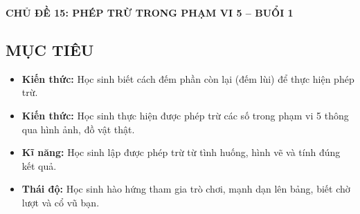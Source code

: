 \documentclass[../main.tex]{subfiles}
\begin{document}
\providecommand{\GPthe}{}\renewcommand{\GPthe}[2]{%
  \GPvat{#1}{1.4}{2.1}
  \node[draw,thick,rounded corners=4pt,fill=PKvangnhat,anchor=north,inner sep=2.5pt,minimum width=1.9cm,text height=1.7ex,text depth=0.5ex] at (0,-0.85) {#2};}
\providecommand{\GPgio}{}\renewcommand{\GPgio}[1]{%
  \draw[PKnau!70!black,line width=3pt] (-0.9,0.55) .. controls (-0.9,1.6) and (0.9,1.6) .. (0.9,0.55);
  \begin{scope}
    \clip (-1.2,0.6) -- (1.2,0.6) -- (0.9,-0.9) -- (-0.9,-0.9) -- cycle;
    \fill[yellow!45!brown!85] (-1.3,-1) rectangle (1.3,0.7);
    \foreach \y in {-0.9,-0.65,...,0.6}{\draw[PKnau!80!black,thick] (-1.3,\y) -- (1.3,\y);}
    \foreach \x in {-1.2,-0.95,...,1.3}{\draw[PKnau!60!black,thin] (\x,-1) -- (\x*0.8,0.7);}
  \end{scope}
  \draw[PKnau!50!black,thick,rounded corners=2pt] (-1.2,0.6) -- (1.2,0.6) -- (0.9,-0.9) -- (-0.9,-0.9) -- cycle;
  \fill[yellow!45!brown,draw=PKnau!50!black,thick,rounded corners=3pt] (-1.28,0.52) rectangle (1.28,0.72);
  \node[draw=PKnau!50!black,thick,circle,fill=white,minimum size=0.95cm,font=\bfseries\huge] at (0,-0.15) {#1};}
\providecommand{\GPgiot}{}\renewcommand{\GPgiot}[2]{%
  \draw[very thick,fill=#1!15] (0,1.05) .. controls (0.12,0.65) and (0.62,0.25) .. (0.62,-0.15) arc (0:-180:0.62) .. controls (-0.62,0.25) and (-0.12,0.65) .. (0,1.05);
  \draw[white,line width=2pt] (-0.38,-0.1) arc (190:240:0.45);
  \node[font=\sffamily\Large] at (0,-0.15) {#2};}

\par\medskip
\begin{center}
    {\color{mauchinh!120}\bfseries\Large CHỦ ĐỀ 15: PHÉP TRỪ TRONG PHẠM VI 5 -- BUỔI 1}
\end{center}

\subsection{MỤC TIÊU}
\begin{itemize}
    \item[-] \textbf{Kiến thức:} Học sinh biết cách đếm phần còn lại (đếm lùi) để thực hiện phép trừ.
    \item[-] \textbf{Kiến thức:} Học sinh thực hiện được phép trừ các số trong phạm vi 5 thông qua hình ảnh, đồ vật thật.
    \item[-] \textbf{Kĩ năng:} Học sinh lập được phép trừ từ tình huống, hình vẽ và tính đúng kết quả.
    \item[-] \textbf{Thái độ:} Học sinh hào hứng tham gia trò chơi, mạnh dạn lên bảng, biết chờ lượt và cổ vũ bạn.
\end{itemize}
\end{document}
